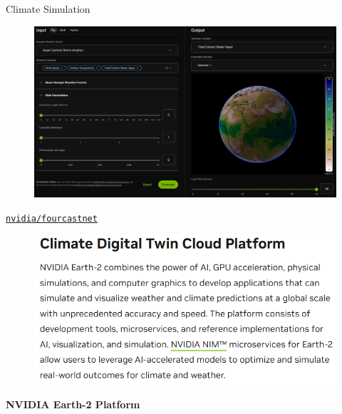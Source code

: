 \begin{frame}[allowframebreaks]{Climate Simulation}
    \begin{figure}
        \centering
        \href{https://build.nvidia.com/nvidia/fourcastnet?snippet_tab=Try}{\includegraphics[height=0.9\textheight,width=1\textwidth,keepaspectratio]{images/science/climate-sim-nvidia-3.png}}
    \end{figure}

    \framebreak

    \begin{center}
        \href{https://build.nvidia.com/nvidia/fourcastnet?snippet_tab=Try}{\texttt{nvidia/fourcastnet}}
    \end{center}

    \framebreak

    \begin{figure}
        \centering
        \includegraphics[height=0.9\textheight,width=1\textwidth,keepaspectratio]{images/science/climate-sim-earth-2.png}
    \end{figure}

    \framebreak

    \textbf{NVIDIA Earth-2 Platform}


\end{frame}
